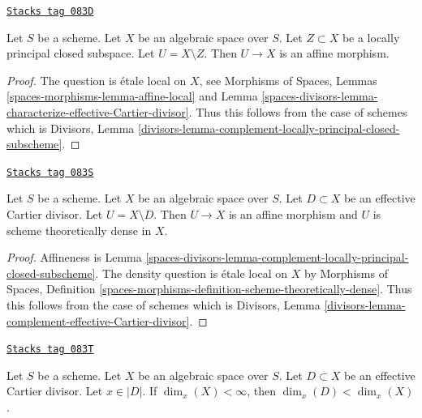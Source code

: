 \begin{lemma}
\label{spaces-divisors-lemma-complement-locally-principal-closed-subscheme}
\href{https://stacks.math.columbia.edu/tag/083D}{\texttt{Stacks tag 083D}}

Let $S$ be a scheme. Let $X$ be an algebraic space over $S$.
Let $Z \subset X$ be a locally principal closed
subspace. Let $U = X \setminus Z$. Then $U \to X$ is an affine morphism.
\end{lemma}

\begin{proof}
The question is \'etale local on $X$, see
Morphisms of Spaces, Lemmas \ref{spaces-morphisms-lemma-affine-local}
and
Lemma \ref{spaces-divisors-lemma-characterize-effective-Cartier-divisor}.
Thus this follows from the case of schemes which is
Divisors, Lemma
\ref{divisors-lemma-complement-locally-principal-closed-subscheme}.
\end{proof}

\begin{lemma}
\label{spaces-divisors-lemma-complement-effective-Cartier-divisor}
\href{https://stacks.math.columbia.edu/tag/083S}{\texttt{Stacks tag 083S}}

Let $S$ be a scheme. Let $X$ be an algebraic space over $S$.
Let $D \subset X$ be an effective Cartier divisor.
Let $U = X \setminus D$. Then $U \to X$ is an affine morphism and $U$
is scheme theoretically dense in $X$.
\end{lemma}

\begin{proof}
Affineness is Lemma \ref{spaces-divisors-lemma-complement-locally-principal-closed-subscheme}.
The density question is \'etale local on $X$ by
Morphisms of Spaces, Definition
\ref{spaces-morphisms-definition-scheme-theoretically-dense}.
Thus this follows from the case of schemes which is
Divisors, Lemma
\ref{divisors-lemma-complement-effective-Cartier-divisor}.
\end{proof}

\begin{lemma}
\label{spaces-divisors-lemma-effective-Cartier-makes-dimension-drop}
\href{https://stacks.math.columbia.edu/tag/083T}{\texttt{Stacks tag 083T}}

Let $S$ be a scheme. Let $X$ be an algebraic space over $S$.
Let $D \subset X$ be an effective Cartier divisor.
Let $x \in |D|$.
If $\dim_x(X) < \infty$, then $\dim_x(D) < \dim_x(X)$.
\end{lemma}

